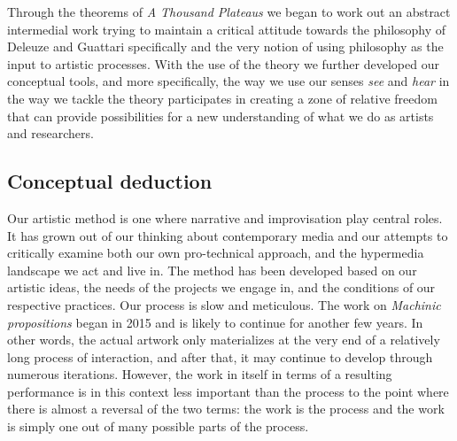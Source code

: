 \documentclass[11pt]{article}
\begin{document}
Through the theorems of \emph{A Thousand Plateaus} we began to work
out an abstract intermedial work trying to maintain a critical
attitude towards the philosophy of Deleuze and Guattari specifically
and the very notion of using philosophy as the input to artistic
processes. With the use of the theory we further developed our
conceptual tools, and more specifically, the way we use our senses
\emph{see} and \emph{hear} in the way we tackle the theory
participates in creating a zone of relative freedom that can provide
possibilities for a new understanding of what we do as artists and
researchers.

\subsection*{Conceptual deduction}
\label{sec:conceptual-deduction}

Our artistic method is one where narrative and improvisation play central
roles. It has grown out of our thinking about contemporary media and
our attempts to critically examine both our own pro-technical
approach, and the hypermedia landscape we act and live in. The method has
been developed based on our artistic ideas, the needs of the projects
we engage in, and the conditions of our respective practices. Our process is slow
and meticulous. The work on \emph{Machinic propositions} began in 2015
and is likely to continue for another few years. In other words, the
actual artwork only materializes at the very end of a relatively long
process of interaction, and after that, it may continue to develop
through numerous iterations. However, the work in itself in terms of a
resulting performance is in this
context less important than the process to the point where there is
almost a reversal of the two terms: the work is the process and the
work is simply one out of many possible parts of the process. 
\end{document}
